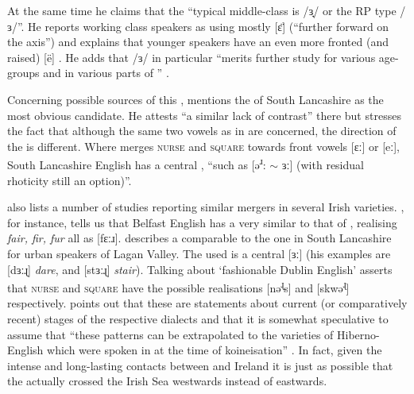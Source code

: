 At the same time he claims that the ``typical middle-class  is /ɜ̟/ or the RP type /ɜ/''. He reports working class speakers as using mostly [ɛ̈] (``further forward on the axis'') and explains that younger speakers have an even more fronted (and raised) [ë] \citep[271]{knowles1973}.
He adds that /ɜ/ in particular ``merits further study for various age-groups and in various parts of '' \citeyearpar[320]{knowles1973}.

Concerning possible sources of this , \citet[128]{honeybone2007} mentions the  of South Lancashire as the most obvious candidate.
He attests ``a similar lack of contrast'' there but stresses the fact that although the same two vowels as in  are concerned, the direction of the  is different.
Where  merges \textsc{nurse} and \textsc{square} towards front vowels [ɛː] or [eː], South Lancashire English has a central , ``such as [ə\textsuperscript{ɹ}: \(\sim\) ɜː] (with residual rhoticity still an option)''.

\citeauthor{honeybone2007} also lists a number of studies reporting similar mergers in several Irish varieties.
\citet{wells1982}, for instance, tells us that Belfast English has a  very similar to that of , realising \emph{fair, fir, fur} all as [fɛːɹ].
\citet[cf.][48]{harris1985} describes a  comparable to the one in South Lancashire for urban speakers of Lagan Valley.
The  used is a central [ɜː] (his examples are [dɜːɻ] \emph{dare}, and [stɜːɻ] \emph{stair}).
Talking about `fashionable Dublin English' \citet{hickey1999} asserts that \textsc{nurse} and \textsc{square} have the possible realisations [nə\textsuperscript{ɻ}s] and [skwə\textsuperscript{ɻ}] respectively.
\citeauthor{honeybone2007} points out that these are statements about current (or comparatively recent) stages of the respective dialects and that it is somewhat speculative to assume that ``these patterns can be extrapolated to the varieties of Hiberno-English which were spoken in  at the time of koineisation'' \citeyearpar[128]{honeybone2007}.
In fact, given the intense and long-lasting contacts between  and Ireland it is just as possible that the  actually crossed the Irish Sea westwards instead of eastwards.

